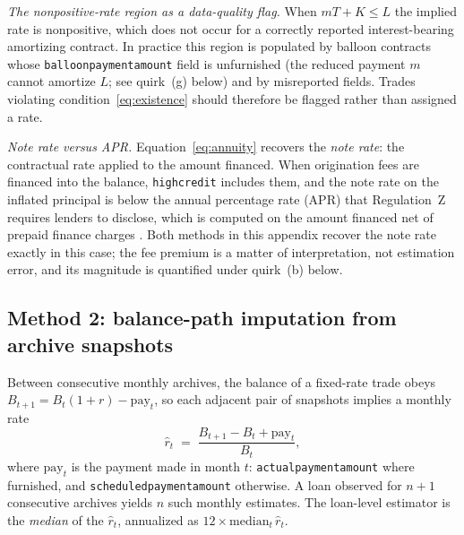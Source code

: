 \emph{The nonpositive-rate region as a data-quality flag.} When $mT + K \le L$ the implied rate is nonpositive, which does not occur for a correctly reported interest-bearing amortizing contract. In practice this region is populated by balloon contracts whose \texttt{balloon\allowbreak payment\allowbreak amount} field is unfurnished (the reduced payment $m$ cannot amortize $L$; see quirk~(g) below) and by misreported fields. Trades violating condition~\eqref{eq:existence} should therefore be flagged rather than assigned a rate.

\emph{Note rate versus APR.} Equation~\eqref{eq:annuity} recovers the \emph{note rate}: the contractual rate applied to the amount financed. When origination fees are financed into the balance, \texttt{highcredit} includes them, and the note rate on the inflated principal is below the annual percentage rate (APR) that Regulation~Z requires lenders to disclose, which is computed on the amount financed net of prepaid finance charges \citep{cfpb_regulation_nodate}. Both methods in this appendix recover the note rate exactly in this case; the fee premium is a matter of interpretation, not estimation error, and its magnitude is quantified under quirk~(b) below.

\subsection{Method 2: balance-path imputation from archive snapshots}\label{appendix:rateimputation:m2}

Between consecutive monthly archives, the balance of a fixed-rate trade obeys $B_{t+1} = B_t(1+r) - \mathrm{pay}_t$, so each adjacent pair of snapshots implies a monthly rate
\begin{equation}\label{eq:balancepath}
\hat r_t \;=\; \frac{B_{t+1} - B_t + \mathrm{pay}_t}{B_t},
\end{equation}
where $\mathrm{pay}_t$ is the payment made in month $t$: \texttt{actual\allowbreak payment\allowbreak amount} where furnished, and \texttt{scheduled\allowbreak payment\allowbreak amount} otherwise. A loan observed for $n+1$ consecutive archives yields $n$ such monthly estimates. The loan-level estimator is the \emph{median} of the $\hat r_t$, annualized as $12 \times \mathrm{median}_t\, \hat r_t$.

